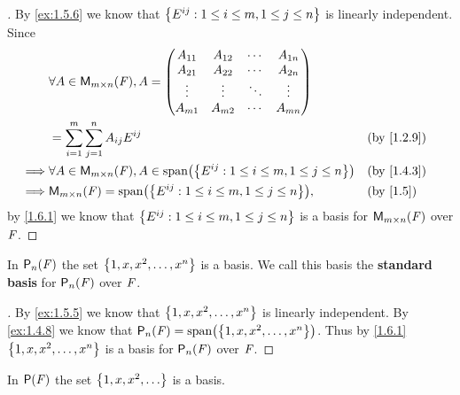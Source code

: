 \begin{proof}[]
	By \cref{ex:1.5.6} we know that \(\left\lbrace E^{i j} : 1 \leq i \leq m, 1 \leq j \leq n\right\rbrace\) is linearly independent.
	Since
	\begin{align*}
		         & \forall A \in \ms, A = \begin{pmatrix}
			                                  A_{1 1} & A_{1 2} & \cdots & A_{1 n} \\
			                                  A_{2 1} & A_{2 2} & \cdots & A_{2 n} \\
			                                  \vdots  & \vdots  & \ddots & \vdots  \\
			                                  A_{m 1} & A_{m 2} & \cdots & A_{m n}
		                                  \end{pmatrix}                                     \\
		         & = \sum_{i = 1}^m \sum_{j = 1}^n A_{i j} E^{i j}                                 &  & \by{1.2.9} \\
		\implies & \forall A \in \ms, A \in \spn{\set{E^{i j} : 1 \leq i \leq m, 1 \leq j \leq n}} &  & \by{1.4.3} \\
		\implies & \ms = \spn{\set{E^{i j} : 1 \leq i \leq m, 1 \leq j \leq n}},                   &  & \by{1.5}
	\end{align*}
	by \cref{1.6.1} we know that \(\left\lbrace E^{i j} : 1 \leq i \leq m, 1 \leq j \leq n\right\rbrace\) is a basis for \(\ms\) over \(\mathit{F}\).
\end{proof}

\begin{eg}\label{1.6.5}
	In \(\ps[n]{\F}\) the set \(\left\lbrace1, x, x^2, \dots, x^n\right\rbrace\) is a basis.
	We call this basis the \textbf{standard basis} for \(\ps[n]{\F}\) over \(\mathit{F}\).
\end{eg}

\begin{proof}[]
	By \cref{ex:1.5.5} we know that \(\left\lbrace1, x, x^2, \dots, x^n\right\rbrace\) is linearly independent.
	By \cref{ex:1.4.8} we know that \(\ps[n]{\F} = \spn{\set{1, x, x^2, \dots, x^n}}\).
	Thus by \cref{1.6.1} \(\left\lbrace1, x, x^2, \dots, x^n\right\rbrace\) is a basis for \(\ps[n]{\F}\) over \(\mathit{F}\).
\end{proof}

\begin{eg}\label{1.6.6}
	In \(\ps{\F}\) the set \(\set{1, x, x^2, \dots}\) is a basis.
\end{eg}

